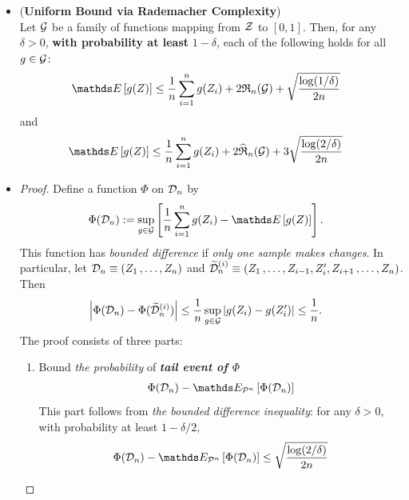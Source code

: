 \documentclass[11pt]{article}
\begin{document}
\begin{itemize}
\item \begin{proposition} (\textbf{Uniform Bound via Rademacher Complexity}) \citep{mohri2018foundations}\\
Let ${\mathcal G}$ be a family of functions mapping from ${\mathcal Z}$ to $[0, 1]$. Then, for any $\delta > 0$, \textbf{with probability at least} $1 - \delta$, each of the following holds for all $g \in {\mathcal G}$:
\begin{align}
\E{}{g(Z)} &\le \frac{1}{n}\sum_{i=1}^{n}g(Z_i) + 2 \frR_{n}(\cG)  + \sqrt{\frac{\log(1 / \delta)}{2n}} \label{eqn: Rademacher_bound_1}
\end{align}
and
\begin{align}
\E{}{g(Z)} &\le \frac{1}{n}\sum_{i=1}^{n}g(Z_i) + 2 \widehat{\mathfrak{R}}_{n}(\cG) + 3\sqrt{\frac{\log(2 / \delta)}{2n}} \label{eqn: Rademacher_bound_2}
\end{align}
\end{proposition}

\item \begin{proof}
Define a function $\Phi$ on ${\mathcal D}_n$ by
\begin{align*}
\Phi(\cD_n) &:= \sup_{g \in \cG}\brac{\frac{1}{n}\sum_{i=1}^{n}g(Z_i) - \E{}{g(Z)}}.
\end{align*} This function has \emph{bounded difference} if \emph{only one sample makes changes}. In particular, let ${\mathcal D}_n \equiv (Z_1 \,{,}\ldots{,}\, Z_n)$ and $\widetilde{{\mathcal D}}_n^{(i)} \equiv (Z_1 \,{,}\ldots{,}\, Z_{i-1}, Z_i', Z_{i+1} \,{,}\ldots{,}\, Z_n)$. Then
\begin{align*}
\left\lvert \Phi({\mathcal D}_n) - \Phi(\widetilde{{\mathcal D}}_n^{(i)}) \right\rvert &\le \frac{1}{n}\sup_{g \in {\mathcal G}}\left\lvert g(Z_i) - g(Z_i') \right\rvert \le \frac{1}{n}.
\end{align*}
The proof consists of three parts:
\begin{enumerate}
\item Bound \emph{the probability} of \emph{\textbf{tail event of $\Phi$}} 
\begin{align*}
\Phi(\cD_n) - \E{\cP^{n}}{\Phi(\cD_n)}
\end{align*} This part follows from \emph{the bounded difference inequality}: for any $\delta > 0$, with probability at least $1 - \delta/2$, 
\begin{align}
\Phi(\cD_n) - \E{\cP^{n}}{\Phi(\cD_n)} \le \sqrt{\frac{\log(2/\delta)}{2n}} \label{pf: rad_comp_bound_1}
\end{align}



\end{enumerate}
\end{proof}
\end{itemize}
\end{document}
